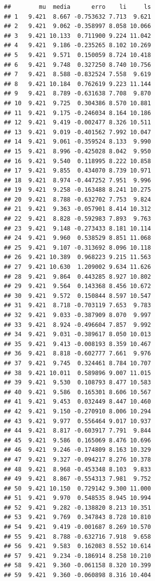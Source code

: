 \documentclass[
]{book}
\begin{document}
\begin{verbatim}
##        mu  media      erro    li     ls
## 1   9.421  8.667 -0.753632 7.713  9.621
## 2   9.421  9.062 -0.358997 8.058 10.066
## 3   9.421 10.133  0.711900 9.224 11.042
## 4   9.421  9.186 -0.235265 8.102 10.269
## 5   9.421  9.571  0.150059 8.724 10.418
## 6   9.421  9.748  0.327250 8.740 10.756
## 7   9.421  8.588 -0.832524 7.558  9.619
## 8   9.421 10.184  0.762619 9.223 11.144
## 9   9.421  8.789 -0.631638 7.708  9.870
## 10  9.421  9.725  0.304386 8.570 10.881
## 11  9.421  9.175 -0.246034 8.164 10.186
## 12  9.421  9.419 -0.002477 8.326 10.511
## 13  9.421  9.019 -0.401562 7.992 10.047
## 14  9.421  9.061 -0.359524 8.133  9.990
## 15  9.421  8.996 -0.425028 8.042  9.950
## 16  9.421  9.540  0.118995 8.222 10.858
## 17  9.421  9.855  0.434070 8.739 10.971
## 18  9.421  8.974 -0.447252 7.951  9.996
## 19  9.421  9.258 -0.163488 8.241 10.275
## 20  9.421  8.788 -0.632702 7.753  9.824
## 21  9.421  9.363 -0.057901 8.414 10.312
## 22  9.421  8.828 -0.592983 7.893  9.763
## 23  9.421  9.148 -0.273433 8.181 10.114
## 24  9.421  9.960  0.538529 8.851 11.068
## 25  9.421  9.107 -0.313692 8.096 10.118
## 26  9.421 10.389  0.968223 9.215 11.563
## 27  9.421 10.630  1.209002 9.634 11.626
## 28  9.421  9.864  0.443285 8.927 10.802
## 29  9.421  9.564  0.143368 8.456 10.672
## 30  9.421  9.572  0.150844 8.597 10.547
## 31  9.421  8.718 -0.703119 7.653  9.783
## 32  9.421  9.033 -0.387909 8.070  9.997
## 33  9.421  8.924 -0.496604 7.857  9.992
## 34  9.421  9.031 -0.389617 8.050 10.013
## 35  9.421  9.413 -0.008193 8.359 10.467
## 36  9.421  8.818 -0.602777 7.661  9.976
## 37  9.421  9.745  0.324461 8.784 10.707
## 38  9.421 10.011  0.589896 9.007 11.015
## 39  9.421  9.530  0.108793 8.477 10.583
## 40  9.421  9.586  0.165301 8.606 10.567
## 41  9.421  9.453  0.032449 8.447 10.460
## 42  9.421  9.150 -0.270910 8.006 10.294
## 43  9.421  9.977  0.556464 9.017 10.937
## 44  9.421  8.817 -0.603917 7.791  9.844
## 45  9.421  9.586  0.165069 8.476 10.696
## 46  9.421  9.246 -0.174809 8.163 10.329
## 47  9.421  9.327 -0.094217 8.276 10.378
## 48  9.421  8.968 -0.453348 8.103  9.833
## 49  9.421  8.867 -0.554313 7.981  9.752
## 50  9.421 10.150  0.729142 9.300 11.000
## 51  9.421  9.970  0.548535 8.945 10.994
## 52  9.421  9.282 -0.138820 8.213 10.351
## 53  9.421  9.769  0.347843 8.728 10.810
## 54  9.421  9.419 -0.001687 8.269 10.570
## 55  9.421  8.788 -0.632716 7.918  9.658
## 56  9.421  9.583  0.162083 8.552 10.614
## 57  9.421  9.234 -0.186914 8.258 10.210
## 58  9.421  9.360 -0.061158 8.320 10.399
## 59  9.421  9.360 -0.060898 8.316 10.404

\end{verbatim}
\end{document}
